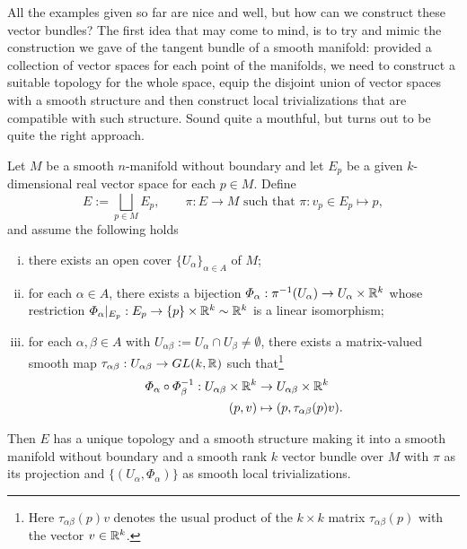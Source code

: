 All the examples given so far are nice and well, but how can we construct these vector bundles?
The first idea that may come to mind, is to  try and mimic the construction we gave of the tangent bundle of a smooth manifold: provided a collection of vector spaces for each point of the manifolds, we need to construct a suitable topology for the whole space, equip the disjoint union of vector spaces with a smooth structure and then construct local trivializations that are compatible with such structure.
Sound quite a mouthful, but turns out to be quite the right approach.

\begin{theorem}\label{thm:bundle_chart_thm}
  Let $M$ be a smooth $n$-manifold without boundary and let $E_p$ be a given $k$-dimensional real vector space for each $p\in M$.
  Define
  \begin{equation}
    E := \bigsqcup_{p\in M} E_p, \qquad
    \pi : E\to M \mbox{ such that } \pi : v_p \in E_p \mapsto p,
  \end{equation}
  and assume the following holds
  \begin{enumerate}[(i)]
    \item there exists an open cover $\{U_\alpha\}_{\alpha\in A}$ of $M$;
    \item for each $\alpha\in A$, there exists a bijection $\varPhi_\alpha: \pi^{-1}(U_\alpha) \to U_\alpha\times\mathbb{R}^k$ whose restriction $\varPhi_\alpha|_{E_p} : E_p \to \{p\}\times\mathbb{R}^k \sim \mathbb{R}^k$ is a linear isomorphism;
    \item for each $\alpha,\beta \in A$ with $U_{\alpha\beta}:=U_\alpha \cap U_\beta \neq \emptyset$, there exists a matrix-valued smooth map $\tau_{\alpha\beta}: U_{\alpha\beta} \to GL(k,\mathbb{R})$ such that\footnote{Here $\tau_{\alpha\beta}(p) v$ denotes the usual product of the $k\times k$ matrix $\tau_{\alpha\beta}(p)$ with the vector $v\in\mathbb{R}^k$.}
          \begin{align}
            \varPhi_\alpha \circ \varPhi_\beta^{-1} : U_{\alpha\beta}\times\mathbb{R}^k & \to U_{\alpha\beta}\times\mathbb{R}^k         \\
            (p, v)                                                              & \mapsto (p, \tau_{\alpha\beta}(p) v).
          \end{align}
  \end{enumerate}
  Then $E$ has a unique topology and a smooth structure making it into a smooth manifold without boundary and a smooth rank $k$ vector bundle over $M$ with $\pi$ as its projection and $\{(U_\alpha, \varPhi_\alpha)\}$ as smooth local trivializations.
\end{theorem}
